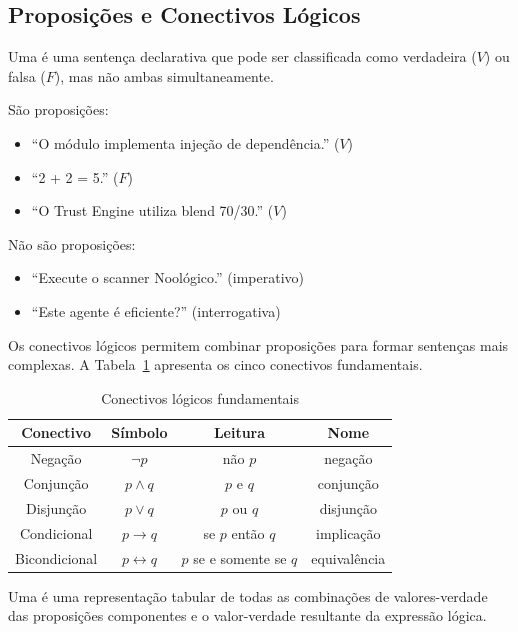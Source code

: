 \subsection{Proposições e Conectivos Lógicos}
\begin{definicao}[Proposição]
Uma  é uma sentença declarativa que pode ser
classificada como verdadeira ($V$) ou falsa ($F$), mas não ambas
simultaneamente.
\end{definicao}
\begin{exemplo}
São proposições:
\begin{itemize}
\item ``O módulo  implementa injeção de
dependência.'' ($V$)
\item ``2 + 2 = 5.'' ($F$)
\item ``O Trust Engine utiliza blend 70/30.'' ($V$)
\end{itemize}
Não são proposições:
\begin{itemize}
\item ``Execute o scanner Noológico.'' (imperativo)
\item ``Este agente é eficiente?'' (interrogativa)
\end{itemize}
\end{exemplo}
Os conectivos lógicos permitem combinar proposições para formar sentenças
mais complexas. A Tabela~\ref{tab:conectivos} apresenta os cinco conectivos
fundamentais.
\begin{table}[htb]
\centering
\caption{Conectivos lógicos fundamentais}
\label{tab:conectivos}
\begin{tabular}{cccc}
\toprule
\textbf{Conectivo} & \textbf{Símbolo} & \textbf{Leitura} &
\textbf{Nome} \\
\midrule
Negação & $\neg p$ & não $p$ & negação \\
Conjunção & $p \land q$ & $p$ e $q$ & conjunção \\
Disjunção & $p \lor q$ & $p$ ou $q$ & disjunção \\
Condicional & $p \to q$ & se $p$ então $q$ & implicação \\
Bicondicional & $p \leftrightarrow q$ & $p$ se e somente se $q$ &
equivalência \\
\bottomrule
\end{tabular}
\end{table}
\begin{definicao}
Uma  é uma representação tabular de todas as
combinações de valores-verdade das proposições componentes e o
valor-verdade resultante da expressão lógica.
\end{definicao}
